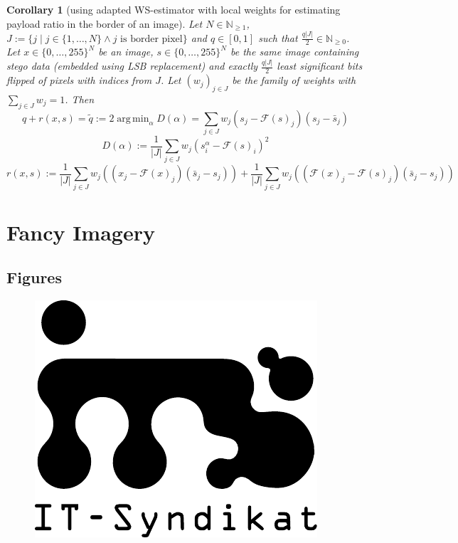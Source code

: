\documentclass[10pt,a4paper,parskip=half]{scrartcl}
\theoremstyle{plain}
\newtheorem{corollary}[theorem]{Corollary}
\DeclareMathOperator*{\argmin}{arg\,min}
\begin{document}
\begin{corollary}[using adapted WS-estimator with local weights for estimating payload ratio in the border of an image]
    Let $N \in \mathbb{N}_{\ge 1}$, $J := \{j \mid j \in \{1, \dots, N\}
    \land j \text{ is border pixel}\}$ and $q \in \left[0, 1\right]$ such that
    $\frac{q |J|}{2} \in \mathbb{N}_{\ge 0}$. Let $x \in \{0, \dots, 255\}^N$
    be an image, $s \in \{0, \dots, 255\}^N$ be the same image containing stego
    data (embedded using LSB replacement) and exactly $\frac{q |J|}{2}$ least
    significant bits flipped of pixels with indices from $J$. Let $(w_j)_{j \in
    J}$ be the family of weights with $\sum\limits_{j \in J}w_j = 1$. Then
    \[
        q + r(x, s) = \tilde{q} := 2 \argmin_\alpha D(\alpha) = \sum\limits_{j \in J} w_j (s_j - \mathcal{F}(s)_j) (s_j - \bar{s}_j)
    \]
    \[
        D(\alpha) := \frac{1}{|J|} \sum\limits_{j \in J} w_j \left(s_i^\alpha - \mathcal{F}(s)_i\right)^2
    \]
    \[
        r(x, s) := \frac{1}{|J|} \sum\limits_{j \in J} w_j \left((x_j - \mathcal{F}(x)_j)(\bar{s}_j - s_j)\right) + \frac{1}{|J|} \sum\limits_{j \in J} w_j \left((\mathcal{F}(x)_j - \mathcal{F}(s)_j)(\bar{s}_j - s_j)\right)
    \]
\end{corollary}

\newpage

\section{Fancy Imagery}
\label{sec:fancy_imagery}

\subsection{Figures}
\label{sub:figures}

\begin{figure}[H]
    \centering
    \includegraphics[width=0.6\linewidth]{its_logo.pdf}
    \label{fig:its_logo}
\end{figure}
\end{document}
